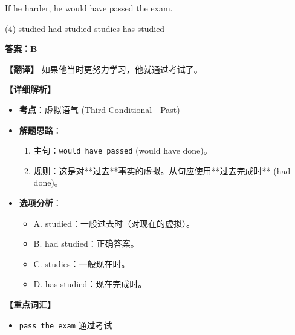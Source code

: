 \documentclass[11pt, a4paper]{article}
\newcommand{\analysis}[4]{
    \begin{solutionbox}
        \textbf{答案：#1}
        
        \textbf{【翻译】} #2
        
        \textbf{【详细解析】}
        #3
        
        \textbf{【重点词汇】}
        #4
    \end{solutionbox}
}
\newcommand{\blank}{\underline{\hspace{1.5cm}}}
\begin{document}
\begin{questions}
    \item If he \blank harder, he would have passed the exam.
    \begin{tasks}(4)
        \task studied \task had studied \task studies \task has studied
    \end{tasks}
    \analysis{B}{如果他当时更努力学习，他就通过考试了。}{
        \begin{itemize}
            \item \textbf{考点}：虚拟语气 (Third Conditional - Past)
            \item \textbf{解题思路}：
                \begin{enumerate}
                    \item 主句：\texttt{would have passed} (would have done)。
                    \item 规则：这是对**过去**事实的虚拟。从句应使用**过去完成时** (had done)。
                \end{enumerate}
            \item \textbf{选项分析}：
                \begin{itemize}
                    \item A. studied：一般过去时（对现在的虚拟）。
                    \item B. had studied：正确答案。
                    \item C. studies：一般现在时。
                    \item D. has studied：现在完成时。
                \end{itemize}
        \end{itemize}
    }{
        \begin{itemize}
            \item \texttt{pass the exam} 通过考试
        \end{itemize}
    }


\end{questions}
\end{document}
